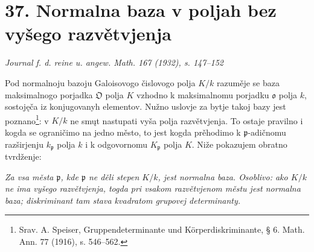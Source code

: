 \documentclass[11pt]{article}
\providecommand{\frakO}{\mathfrak{O}}
\providecommand{\frako}{\mathfrak{o}}
\providecommand{\frakp}{\mathfrak{p}}
\begin{document}
\section*{37. Normalna baza v poljah bez vyšego razvětvjenja}

\begin{center}
\emph{Journal f. d. reine u. angew. Math. 167 (1932), s. 147--152}
\end{center}

Pod normalnoju bazoju Galoisovogo čislovogo polja \(K/k\) razuměje se baza maksimalnogo porjadka \(\frakO\) polja \(K\) vzhodno k maksimalnomu porjadku \(\frako\) polja \(k\), sostojęča iz konjugovanyh elementov. Nužno uslovje za bytje takoj bazy jest poznano\footnote{Srav. A. Speiser, Gruppendeterminante und Körperdiskriminante, § 6. Math. Ann. 77 (1916), s. 546--562.}: v \(K/k\) ne smųt nastupati vyša polja razvětvjenja. To ostaje pravilno i kogda se ograničimo na jedno město, to jest kogda prěhodimo k \(\frakp\)-adičnomu razširjenju \(k_\frakp\) polja \(k\) i k odgovornomu \(K_\frakp\) polja \(K\). Niže pokazujem obratno tvrdženje:

\emph{Za vsa města \(\frakp\), kde \(\frakp\) ne děli stepen \(K/k\), jest normalna baza. Osoblivo: ako \(K/k\) ne ima vyšego razvětvjenja, togda pri vsakom razvětvjenom městu jest normalna baza; diskriminant tam stava kvadratom grupovej determinanty.}
\end{document}
